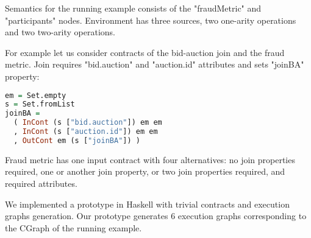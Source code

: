 Semantics for the running example consists of the "fraudMetric" and "participants" nodes.
Environment has three sources, two one-arity operations and two two-arity operations.

For example let us consider contracts of the bid-auction join and the fraud metric.
Join requires "bid.auction" and "auction.id" attributes and sets "joinBA" property:
\begin{lstlisting}[language=Haskell]
em = Set.empty
s = Set.fromList
joinBA =
  ( InCont (s ["bid.auction"]) em em
  , InCont (s ["auction.id"]) em em
  , OutCont em (s ["joinBA"]) )
\end{lstlisting}

Fraud metric has one input contract with four alternatives: no join properties required, one or another join property, or two join properties required, and required attributes.

We implemented a prototype in Haskell with trivial contracts and execution graphs generation.
Our prototype generates 6 execution graphs corresponding to the CGraph of the running example.
